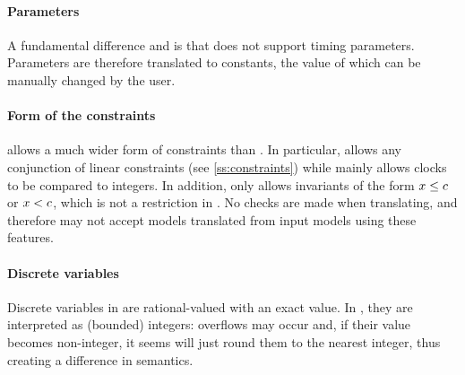 \paragraph{Parameters}
A fundamental difference \imitator{} and \uppaal{} is that \uppaal{} does not support timing parameters.
Parameters are therefore translated to constants, the value of which can be manually changed by the user.

\paragraph{Form of the constraints}
\imitator{} allows a much wider form of constraints than \uppaal{}.
In particular, \imitator{} allows any conjunction of linear constraints (see \cref{ss:constraints}) while \uppaal{} mainly allows clocks to be compared to integers.
In addition, \uppaal{} only allows invariants of the form $x \leq c$ or $x < c$, which is not a restriction in \imitator{}.
No checks are made when translating, and therefore \uppaal{} may not accept models translated from \imitator{} input models using these features.

\paragraph{Discrete variables}
Discrete variables in \imitator{} are rational-valued with an exact value.
In \uppaal{}, they are interpreted as (bounded) integers: overflows may occur and, if their value becomes non-integer, it seems \uppaal{} will just round them to the nearest integer, thus creating a difference in semantics.

